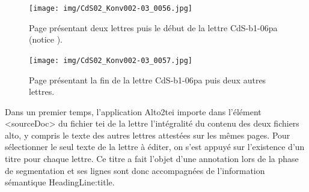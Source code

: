\documentclass[a4paper,12pt,twoside]{book}
\begin{document}
			\begin{figure}[!h]
				\centering
				\texttt{[image: img/CdS02\_Konv002-03\_0056.jpg]}
				\caption{Page présentant deux lettres puis le début de la lettre \textsf{CdS-b1-06pa} (notice \cite{CdS02056057}).}
				\label{56int}
			\end{figure}

			\begin{figure}[!h]
				\centering
				\texttt{[image: img/CdS02\_Konv002-03\_0057.jpg]}
				\caption{Page présentant la fin de la lettre \textsf{CdS-b1-06pa} puis deux autres lettres.}
				\label{57int}
			\end{figure}
		
			Dans un premier temps, l'application Alto2tei importe dans l'élément \textsf{<sourceDoc>} du fichier \gls{tei} de la lettre l'intégralité du contenu des deux fichiers \gls{alto}, y compris le texte des autres lettres attestées sur les mêmes pages. Pour sélectionner le seul texte de la lettre à éditer, on s'est appuyé sur l'existence d'un titre pour chaque lettre. Ce titre a fait l'objet d'une annotation lors de la phase de \gls{segmentation} et ses lignes sont donc accompagnées de l'information sémantique \textsf{HeadingLine:title}.
			
\end{document}
